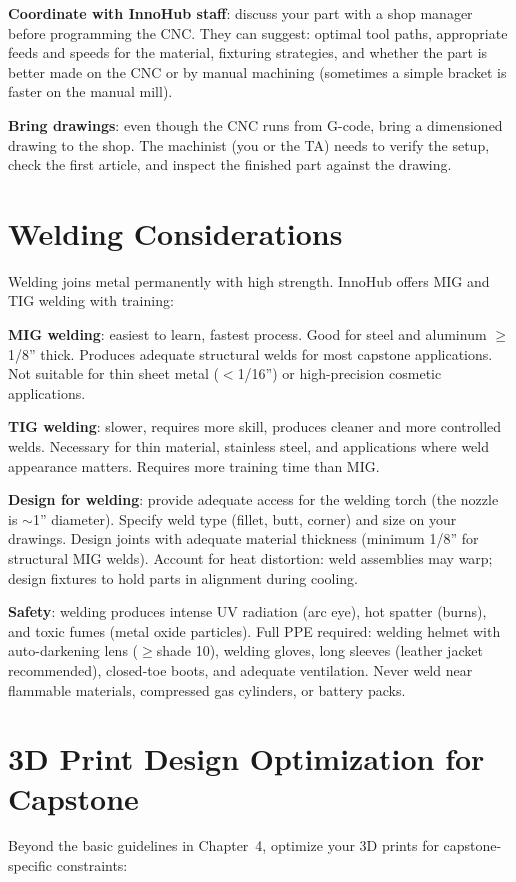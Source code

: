 \textbf{Coordinate with InnoHub staff}: discuss your part with a shop manager before programming the CNC. They can suggest: optimal tool paths, appropriate feeds and speeds for the material, fixturing strategies, and whether the part is better made on the CNC or by manual machining (sometimes a simple bracket is faster on the manual mill).

\textbf{Bring drawings}: even though the CNC runs from G-code, bring a dimensioned drawing to the shop. The machinist (you or the TA) needs to verify the setup, check the first article, and inspect the finished part against the drawing.

\section{Welding Considerations}
Welding joins metal permanently with high strength. InnoHub offers MIG and TIG welding with training:

\textbf{MIG welding}: easiest to learn, fastest process. Good for steel and aluminum $\geq$1/8'' thick. Produces adequate structural welds for most capstone applications. Not suitable for thin sheet metal ($<$1/16'') or high-precision cosmetic applications.

\textbf{TIG welding}: slower, requires more skill, produces cleaner and more controlled welds. Necessary for thin material, stainless steel, and applications where weld appearance matters. Requires more training time than MIG.

\textbf{Design for welding}: provide adequate access for the welding torch (the nozzle is $\sim$1'' diameter). Specify weld type (fillet, butt, corner) and size on your drawings. Design joints with adequate material thickness (minimum 1/8'' for structural MIG welds). Account for heat distortion: weld assemblies may warp; design fixtures to hold parts in alignment during cooling.

\textbf{Safety}: welding produces intense UV radiation (arc eye), hot spatter (burns), and toxic fumes (metal oxide particles). Full PPE required: welding helmet with auto-darkening lens ($\geq$shade 10), welding gloves, long sleeves (leather jacket recommended), closed-toe boots, and adequate ventilation. Never weld near flammable materials, compressed gas cylinders, or battery packs.



\section{3D Print Design Optimization for Capstone}
Beyond the basic guidelines in Chapter~4, optimize your 3D prints for capstone-specific constraints:


